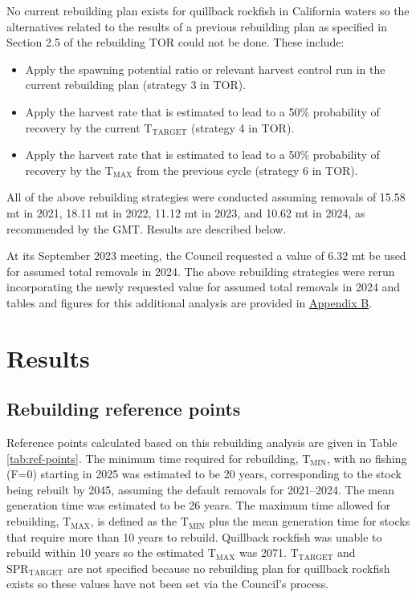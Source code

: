 \documentclass[11pt,
  letterpaper,
]{article}
\begin{document}
No current rebuilding plan exists for quillback rockfish in California waters so the alternatives related to the results of a previous rebuilding plan as specified in Section 2.5 of the rebuilding TOR could not be done. These include:

\begin{itemize}
 \item Apply the spawning potential ratio or relevant harvest control run in the current rebuilding plan (strategy 3 in TOR). 
 \item Apply the harvest rate that is estimated to lead to a 50$\%$ probability of recovery by the current $\text{T}_\text{TARGET}$ (strategy 4 in TOR).
 \item Apply the harvest rate that is estimated to lead to a 50$\%$ probability of recovery by the $\text{T}_\text{MAX}$ from the previous cycle (strategy 6 in TOR).
\end{itemize}

All of the above rebuilding strategies were conducted assuming removals of 15.58 mt in 2021, 18.11 mt in 2022, 11.12 mt in 2023, and 10.62 mt in 2024, as recommended by the GMT. Results are described below.

At its September 2023 meeting, the Council requested a value of 6.32 mt be used for assumed total removals in 2024. The above rebuilding strategies were rerun incorporating the newly requested value for assumed total removals in 2024 and tables and figures for this additional analysis are provided in \protect\hyperlink{append_b}{Appendix B}.

\hypertarget{results}{%
\section{Results}\label{results}}

\hypertarget{rebuilding-reference-points}{%
\subsection{Rebuilding reference points}\label{rebuilding-reference-points}}

Reference points calculated based on this rebuilding analysis are given in Table \ref{tab:ref-points}. The minimum time required for rebuilding, \(\text{T}_\text{MIN}\), with no fishing (F=0) starting in 2025 was estimated to be 20 years, corresponding to the stock being rebuilt by 2045, assuming the default removals for 2021--2024. The mean generation time was estimated to be 26 years. The maximum time allowed for rebuilding, \(\text{T}_\text{MAX}\), is defined as the \(\text{T}_\text{MIN}\) plus the mean generation time for stocks that require more than 10 years to rebuild. Quillback rockfish was unable to rebuild within 10 years so the estimated \(\text{T}_\text{MAX}\) was 2071. \(\text{T}_\text{TARGET}\) and \(\text{SPR}_\text{TARGET}\) are not specified because no rebuilding plan for quillback rockfish exists so these values have not been set via the Council's process.
\end{document}
